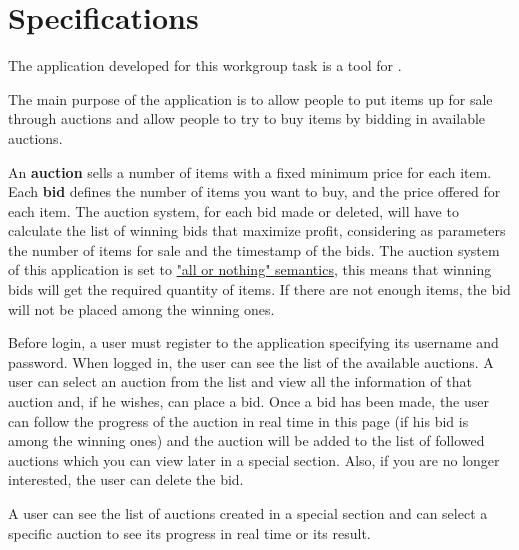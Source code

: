 \chapter{Specifications}\label{ch:specs}

The application developed for this workgroup task is a tool for .

The main purpose of the application is to allow people to put items up for sale
through auctions and allow people to try to buy items by bidding in available
auctions.

An \textbf{auction} sells a number of items with a fixed minimum price for each
item. Each \textbf{bid} defines the number of items you want to buy, and the
price offered for each item. The auction system, for each bid made or deleted,
will have to calculate the list of winning bids that maximize profit,
considering as parameters the number of items for sale and the timestamp of the
bids.  The auction system of this application is set to \underline{"all or
nothing" semantics}, this means that winning bids will get the required quantity
of items. If there are not enough items, the bid will not be placed among the
winning ones.

Before login, a user must register to the application specifying its username
and password. When logged in, the user can see the list of the available
auctions. A user can select an auction from the list and view all the
information of that auction and, if he wishes, can place a bid. Once a bid has
been made, the user can follow the progress of the auction in real time in this
page (if his bid is among the winning ones) and the auction will be added to the
list of followed auctions which you can view later in a special section.  Also,
if you are no longer interested, the user can delete the bid.

A user can see the list of auctions created in a special section and can select
a specific auction to see its progress in real time or its result.
